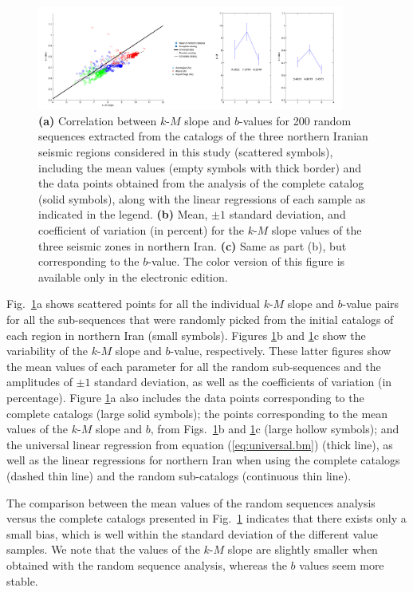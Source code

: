 \begin{figure}%
	\centering
	\includegraphics[width=0.9\textwidth]{figures/pdf/figure-08-rev.pdf} 
	\caption{\textbf{(a)} Correlation between $k$-$M$ slope and $b$-values for 200 random sequences extracted from the  catalogs of the three northern Iranian seismic regions considered in this study (scattered symbols), including the mean values (empty symbols with thick border) and the data points obtained from the analysis of the complete catalog (solid symbols), along with the linear regressions of each sample as indicated in the legend. \textbf{(b)} Mean, $\pm1$ standard deviation, and coefficient of variation (in percent) for the $k$-$M$ slope values of the three seismic zones in northern Iran. \textbf{(c)} Same as part (b), but corresponding to the $b$-value. The color version of this figure is available only in the electronic edition.}
	\label{fig:random}
\end{figure}

Fig.~\ref{fig:random}a shows scattered points for all the individual $k$-$M$ slope and $b$-value pairs for all the sub-sequences that were randomly picked from the initial catalogs of each region in northern Iran (small symbols). Figures \ref{fig:random}b and \ref{fig:random}c show the variability of the $k$-$M$ slope and $b$-value, respectively. These latter figures show the mean values of each parameter for all the random sub-sequences and the amplitudes of $\pm 1$ standard deviation, as well as the coefficients of variation (in percentage). Figure \ref{fig:random}a also includes the data points corresponding to the complete catalogs (large solid symbols); the points corresponding to the mean values of the $k$-$M$ slope and $b$, from Figs.~\ref{fig:random}b and \ref{fig:random}c (large hollow symbols); and the universal linear regression from equation (\ref{eq:universal.bm}) (thick line), as well as the linear regressions for northern Iran when using the complete catalogs (dashed thin line) and the random sub-catalogs (continuous thin line). 

The comparison between the mean values of the random sequences analysis versus the complete catalogs presented in Fig.~\ref{fig:random} indicates that there exists only a small bias, which is well within the standard deviation of the different value samples. We note that the values of the $k$-$M$ slope are slightly smaller when obtained with the random sequence analysis, whereas the $b$ values seem more stable. 

